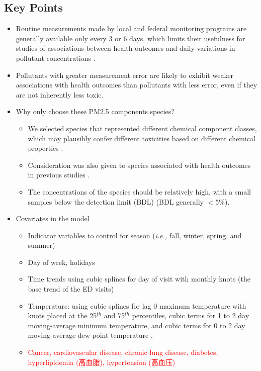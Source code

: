 \documentclass{article}
\begin{document}
\subsection{Key Points}
\begin{itemize}
    \item Routine measurements made by local and federal monitoring programs are generally available only every 3 or 6 days, which limits their usefulness for studies of associations between health outcomes and daily variations in pollutant concentrations \citep{sarnat2015fine}.
    \item Pollutants with greater measurement error are likely to exhibit weaker associations with health outcomes than pollutants with less error, even if they are not inherently less toxic.
    \item Why only choose these PM2.5 components species? {
        \begin{itemize}
            \item We selected species that represented different chemical component classes, which may plausibly confer different toxicities based on different chemical properties \citep{suh2011chemical}. 
            \item Consideration was also given to species associated with health outcomes in previous studies \citep{chen2009effects, kelly2012size, rohr2012attributing}.
            \item The concentrations of the species should be relatively high, with a small samples below the detection limit (BDL) (BDL generally $<5\%$).
        \end{itemize}
    }
    \item Covariates in the model {
        \begin{itemize}
            \item Indicator variables to control for season (\textit{i.e.,} fall, winter, spring, and summer)
            \item Day of week, holidays
            \item Time trends using cubic splines for day of visit with monthly knots (the base trend of the ED visits)
            \item Temperature: using cubic splines for lag 0 maximum temperature with knots placed at the 25$^{th}$ and 75$^{th}$ percentiles, cubic terms for 1 to 2 day moving-average minimum temperature, and cubic terms for 0 to 2 day moving-average dew point temperature \citep{strickland2010short}.
            \item \textcolor{red}{Cancer, cardiovascular disease, chronic lung disease, diabetes, hyperlipidemia (高血脂), hypertension (高血压)}

\end{itemize}}
\end{itemize}
\end{document}
